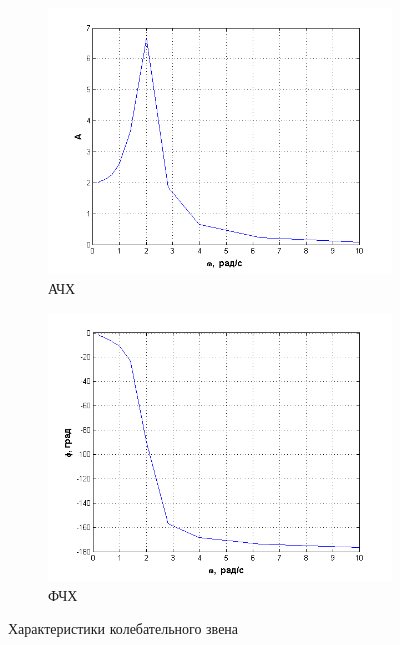 \documentclass[a4paper, 11pt, russian]{article}
\begin{document}
	\begin{figure}[ht!]\ContinuedFloat
		\centering
        \begin{subfigure}[h]{0.48\textwidth}
            \includegraphics[width = \textwidth]{oscillatoryLinkAFR}
            \caption{АЧХ}
        \end{subfigure}
        \hfill
        \begin{subfigure}[h]{0.48\textwidth}
            \includegraphics[width = \textwidth]{oscillatoryLinkPFR}
            \caption{ФЧХ}
        \end{subfigure}
        \caption{Характеристики колебательного звена}
    \end{figure}
\end{document}
